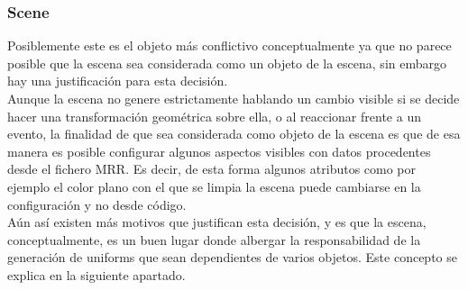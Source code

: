 \subsubsection{Scene}
Posiblemente este es el objeto más conflictivo conceptualmente ya que no parece posible que la escena sea considerada como un objeto de la escena, sin embargo hay una justificación para esta decisión.\\
Aunque la escena no genere estrictamente hablando un cambio visible si se decide hacer una transformación geométrica sobre ella, o al reaccionar frente a un evento, la finalidad de que sea considerada como objeto de la escena es que de esa manera es posible configurar algunos aspectos visibles con datos procedentes desde el fichero MRR. Es decir, de esta forma algunos atributos como por ejemplo el color plano con el que se limpia la escena puede cambiarse en la configuración y no desde código.\\
Aún así existen más motivos que justifican esta decisión, y es que la escena, conceptualmente, es un buen lugar donde albergar la responsabilidad de la generación de uniforms que sean dependientes de varios objetos. Este concepto se explica en la siguiente apartado.

